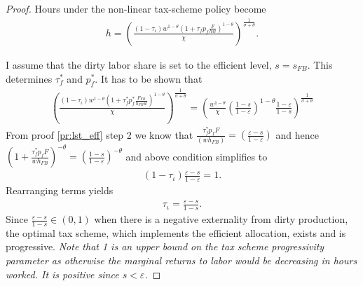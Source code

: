 \begin{proof}
	Hours under the non-linear tax-scheme policy become
	\begin{align}
	h=\left(\frac{(1-\tau_{\iota})w^{1-\theta}(1+\tau_f p_f\frac{F}{hw})^{1-\theta}}{\chi}\right)^\frac{1}{\sigma+\theta}.
	\end{align}

	I assume that the dirty labor share is set to the efficient level, $s=s_{FB}$. This determines $\tau^*_f$ and $p^*_f$.
	It has to be shown that
	\begin{align}
	\left(\frac{(1-\tau_{\iota})w^{1-\theta}\left(1+\tau^*_f p^*_f\frac{F_{FB}}{h_{FB}w}\right)^{1-\theta}}{\chi}\right)^\frac{1}{\sigma+\theta}=\left(\frac{w^{1-\theta}}{\chi}\left(\frac{1-s}{1-\varepsilon}\right)^{1-\theta}\frac{1-\varepsilon}{1-s}\right)^\frac{1}{\sigma+\theta}
	\end{align}
	 From proof \ref{pr:lst_eff} step 2 we know that $\frac{\tau_f^*p_fF}{(wh_{FB})}=\left(\frac{\varepsilon-s}{1-\varepsilon}\right)$ and hence $\left(1+\frac{\tau_f^*p_fF}{wh_{FB}}\right)^{-\theta}=\left(\frac{1-s}{1-\varepsilon}\right)^{-\theta}$ and above condition simplifies to
	 \begin{align}
	(1-\tau_{\iota})\frac{\varepsilon-s}{1-\varepsilon}=1.
	 \end{align}
	 Rearranging terms yields
	 \begin{align}
	\tau_{\iota}= \frac{\varepsilon-s}{1-s}.
	 \end{align}
	 Since $\frac{\varepsilon-s}{1-s}\in(0,1)$ when there is a negative externality from dirty production, the optimal tax scheme, which implements the efficient allocation, exists and is progressive. \textit{Note that 1 is an upper bound on the tax scheme progressivity parameter as otherwise the marginal returns to labor would be decreasing in hours worked. It is positive since $s<\varepsilon$.}
\end{proof}

